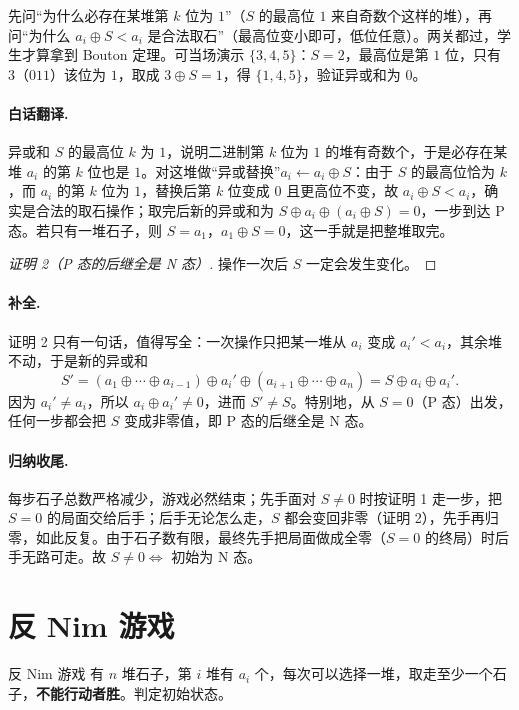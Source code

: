 \documentclass[UTF8,a4paper,11pt,oneside,openany,fontset=fandol]{ctexbook}
\theoremstyle{definition}
\begin{document}
\begin{teach}[证明中的两个关卡]
先问“为什么必存在某堆第 $k$ 位为 $1$”（$S$ 的最高位 $1$ 来自奇数个这样的堆），再问“为什么 $a_i\oplus S<a_i$ 是合法取石”（最高位变小即可，低位任意）。两关都过，学生才算拿到 Bouton 定理。可当场演示 $\{3,4,5\}$：$S=2$，最高位是第 $1$ 位，只有 $3$（$011$）该位为 $1$，取成 $3\oplus S=1$，得 $\{1,4,5\}$，验证异或和为 $0$。
\end{teach}
\paragraph{白话翻译.} 异或和 $S$ 的最高位 $k$ 为 $1$，说明二进制第 $k$ 位为 $1$ 的堆有奇数个，于是必存在某堆 $a_i$ 的第 $k$ 位也是 $1$。对这堆做“异或替换”$a_i\leftarrow a_i\oplus S$：由于 $S$ 的最高位恰为 $k$，而 $a_i$ 的第 $k$ 位为 $1$，替换后第 $k$ 位变成 $0$ 且更高位不变，故 $a_i\oplus S<a_i$，确实是合法的取石操作；取完后新的异或和为 $S\oplus a_i\oplus(a_i\oplus S)=0$，一步到达 P 态。若只有一堆石子，则 $S=a_1$，$a_1\oplus S=0$，这一手就是把整堆取完。

\begin{proof}[证明 2（P 态的后继全是 N 态）]
操作一次后 $S$ 一定会发生变化。
\end{proof}
\paragraph{补全.} 证明 2 只有一句话，值得写全：一次操作只把某一堆从 $a_i$ 变成 $a_i'<a_i$，其余堆不动，于是新的异或和
\[
 S'=(a_1\oplus\cdots\oplus a_{i-1})\oplus a_i'\oplus(a_{i+1}\oplus\cdots\oplus a_n)=S\oplus a_i\oplus a_i'.
\]
因为 $a_i'\ne a_i$，所以 $a_i\oplus a_i'\ne0$，进而 $S'\ne S$。特别地，从 $S=0$（P 态）出发，任何一步都会把 $S$ 变成非零值，即 P 态的后继全是 N 态。

\paragraph{归纳收尾.} 每步石子总数严格减少，游戏必然结束；先手面对 $S\ne0$ 时按证明 1 走一步，把 $S=0$ 的局面交给后手；后手无论怎么走，$S$ 都会变回非零（证明 2），先手再归零，如此反复。由于石子数有限，最终先手把局面做成全零（$S=0$ 的终局）时后手无路可走。故 $S\ne0\iff$ 初始为 N 态。

\section{反 Nim 游戏}
\begin{problem}{反 Nim 游戏}
有 $n$ 堆石子，第 $i$ 堆有 $a_i$ 个，每次可以选择一堆，取走至少一个石子，\textbf{不能行动者胜}。判定初始状态。
\end{problem}
\end{document}
